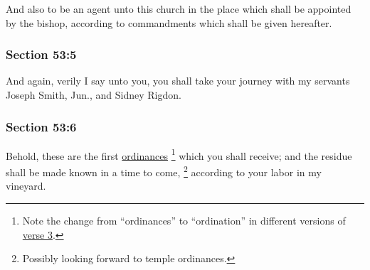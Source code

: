 		And also to be an agent unto this church in the place which shall be appointed by the bishop, according to commandments which shall be given hereafter.


	\subsubsection{Section 53:5} %
		\label{DC53-5}

		And again, verily I say unto you, you shall take your journey with my servants Joseph Smith, Jun., and Sidney Rigdon.


	\subsubsection{Section 53:6} %
		\label{DC53-6}

		Behold, these are the first \hyperref[ORDINANCE]{ordinances}%
			\footnote{%
				Note the change from ``ordinances'' to ``ordination'' in different versions of \hyperref[DC53-3]{verse 3}.
				}
		which you shall receive; and the residue shall be made known in a time to come,%
			\footnote{%
				Possibly looking forward to temple ordinances.
				}
		according to your labor in my vineyard.


